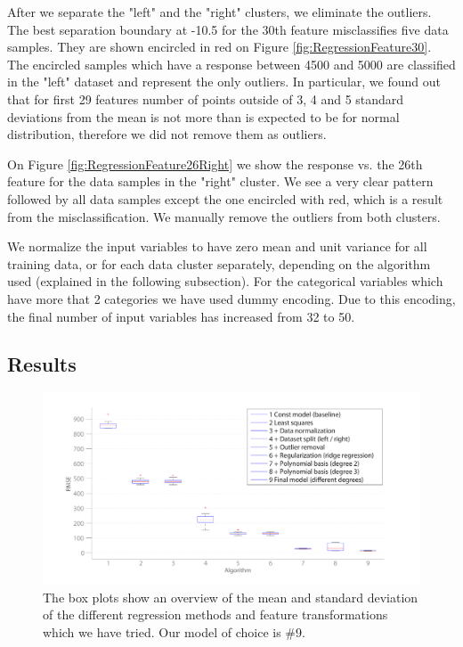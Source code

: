 \documentclass{article} %
\begin{document}
After we separate the "left" and the "right" clusters, we eliminate the outliers. 
The best separation boundary at -10.5 for the 30th feature misclassifies five data samples. 
They are shown encircled in red on Figure \ref{fig:RegressionFeature30}. 
The encircled samples which have a response between 4500 and 5000 are classified in the "left" dataset 
and represent the only outliers. In particular, we found out that for first 29
features number of points outside of 3, 4 and 5 standard deviations from the
mean is not more than is expected to be for normal distribution, therefore we
did not remove them as outliers.

On Figure \ref{fig:RegressionFeature26Right} we show the response vs. the 26th feature 
for the data samples in the "right" cluster. 
We see a very clear pattern followed by all data samples except the one encircled with red, 
which is a result from the misclassification. 
We manually remove the outliers from both clusters.

We normalize the input variables to have zero mean 
and unit variance for all training data, or for each data cluster separately,
 depending on the algorithm used (explained in the following subsection). 
 For the categorical variables which have more that 2 categories we have used dummy encoding. 
 Due to this encoding, the final number of input variables has increased from 32 to 50.

\subsection{Results}

\begin{figure}[t!]
	\center
	\includegraphics[trim=23mm 10mm 35mm 10mm, clip=true, width=1\columnwidth]{figures/RegressionHist3.pdf}
	\caption{The box plots show an overview of the mean and standard deviation of the different regression methods and feature transformations which we have tried. Our model of choice is \#9.}
	\label{fig:RegressionHist}
\end{figure}
\end{document}
